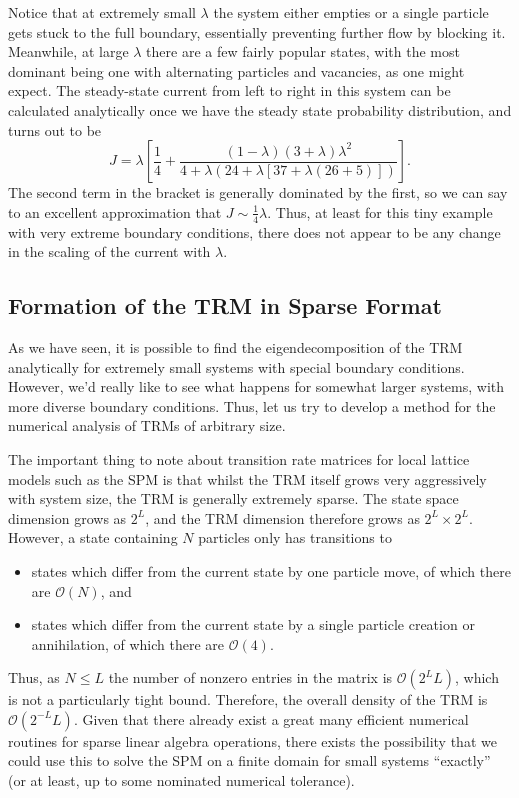 Notice that at extremely small $\lambda$ the system either empties or a single particle gets stuck to
the full boundary, 
essentially preventing further flow by blocking it. Meanwhile, at large $\lambda$ there are
a few fairly popular states, with the most dominant being one with alternating particles and 
vacancies, as one might expect. The steady-state current from left to right in this system can be
calculated analytically once we have the steady state probability distribution, and turns out to be
\begin{equation}
 J = \lambda \left[ \frac{1}{4} + \frac{(1-\lambda)(3+\lambda)\lambda^2}{4+
 \lambda\left(24+\lambda\left[37+\lambda\left(26+5\right)\right]\right)}  \right].
\end{equation}
The second term in the bracket is generally dominated by the first, so we can say to an excellent
approximation that $J \sim \frac{1}{4} \lambda$. Thus, at least for this tiny example with very
extreme boundary conditions, there does not appear to be any change in the scaling of the current
with $\lambda$.


\subsection{Formation of the TRM in Sparse Format}

As we have seen, it is possible to find the eigendecomposition of the TRM analytically for extremely
small systems with special boundary conditions. However, we'd really like to see what happens for
somewhat larger systems, with more diverse boundary conditions. Thus, let us try to develop
a method for the numerical analysis of TRMs of arbitrary size.

The important thing to note about transition rate matrices for local lattice models
such as the SPM is that whilst the TRM itself grows very aggressively with system size, the TRM is generally extremely sparse.
The state space dimension grows as $2^L$, and the TRM dimension therefore grows as
$2^L \times 2^L$. However, a state containing $N$ particles only has transitions to
\begin{itemize}
 \item states which differ from the current state by one particle move, of which there
 are $\mathcal{O}(N)$, and
 \item states which differ from the current state by a single particle creation or
 annihilation, of which there are $\mathcal{O}(4)$.
\end{itemize}
Thus, as $N \le L$ the number of nonzero entries in the matrix is 
$\mathcal{O}(2^{L}L)$,
which is not a particularly tight bound. Therefore, the overall density of the TRM
is $\mathcal{O}(2^{-L}L)$. Given that there already exist a great many efficient
numerical routines for sparse linear algebra operations, there exists the possibility
that we could use this to solve the SPM on a finite domain for small systems
``exactly'' (or at least, up to some nominated numerical tolerance).

